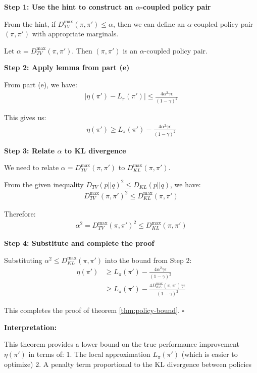 \textbf{Step 1: Use the hint to construct an $\alpha$-coupled policy pair}

From the hint, if $D_{TV}^{\max} (\pi, \pi') \le \alpha$, then we can define an $\alpha$-coupled policy pair $(\pi, \pi')$ with appropriate marginals.

Let $\alpha = D_{TV}^{\max} (\pi, \pi')$. Then $(\pi, \pi')$ is an $\alpha$-coupled policy pair.

\textbf{Step 2: Apply lemma from part (e)}

From part (e), we have:
\begin{align}
|\eta(\pi') - L_{\pi}(\pi')| \le \frac{4\alpha^2\gamma\epsilon}{(1-\gamma)^2}
\end{align}

This gives us:
\begin{align}
\eta(\pi') \ge L_{\pi}(\pi') - \frac{4\alpha^2\gamma\epsilon}{(1-\gamma)^2}
\end{align}

\textbf{Step 3: Relate $\alpha$ to KL divergence}

We need to relate $\alpha = D_{TV}^{\max} (\pi, \pi')$ to $D_{KL}^{\max}(\pi, \pi')$.

From the given inequality $D_{TV}(p||q)^2 \le D_{KL}(p||q)$, we have:
\begin{align}
D_{TV}^{\max} (\pi, \pi')^2 \le D_{KL}^{\max}(\pi, \pi')
\end{align}

Therefore:
\begin{align}
\alpha^2 = D_{TV}^{\max} (\pi, \pi')^2 \le D_{KL}^{\max}(\pi, \pi')
\end{align}

\textbf{Step 4: Substitute and complete the proof}

Substituting $\alpha^2 \le D_{KL}^{\max}(\pi, \pi')$ into the bound from Step 2:
\begin{align}
\eta(\pi') &\ge L_{\pi}(\pi') - \frac{4\alpha^2\gamma\epsilon}{(1-\gamma)^2} \\
&\ge L_{\pi}(\pi') - \frac{4D_{KL}^{\max}(\pi, \pi')\gamma\epsilon}{(1-\gamma)^2}
\end{align}

This completes the proof of theorem \ref{thm:policy-bound}. $\square$

\textbf{Interpretation:}

This theorem provides a lower bound on the true performance improvement $\eta(\pi')$ in terms of:
1. The local approximation $L_{\pi}(\pi')$ (which is easier to optimize)
2. A penalty term proportional to the KL divergence between policies

